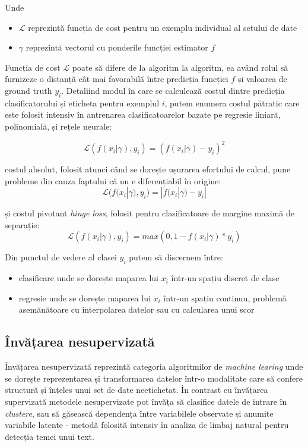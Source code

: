 Unde 
\begin{itemize}
\item $\mathcal{L}$ reprezintă funcția de cost pentru un exemplu individual al setului de date
\item $\gamma$ reprezintă vectorul cu ponderile funcției estimator $f$ 
\end{itemize}

Funcția de cost $\mathcal{L}$ poate să difere de la algoritm la algoritm, ea având rolul să furnizeze o distanță cât mai favorabilă între predicția funcției $f$ și valoarea de ground truth $y_i$. Detaliind modul în care se calculează costul dintre predicția clasificatorului și eticheta pentru exemplul $i$, putem enumera costul pătratic care este folosit intensiv în antrenarea clasificatoarelor bazate pe regresie liniară, polinomială, și rețele neurale:

\begin{equation}
\mathcal{L}(f(x_i | \gamma), y_i) = (f(x_i | \gamma) -  y_i)^2
\label{eq:mse}
\end{equation}

costul absolut, folosit atunci când se dorește ușurarea efortului de calcul, pune probleme din cauza faptului că nu e diferențiabil în origine:
\begin{equation}
\mathcal{L}(f(x_i | \gamma), y_i) = |f(x_i | \gamma) -  y_i|
\label{eq:abserr}
\end{equation}

și costul pivotant \textit{hinge loss}, folosit pentru clasificatoare de margine maximă de separație:
\begin{equation}
\mathcal{L}(f(x_i | \gamma), y_i) = max(0,1 -  f(x_i | \gamma)*y_i)
\label{eq:hinge}
\end{equation}

Din punctul de vedere al clasei $y_i$ putem să discernem între:
\begin{itemize}
\item clasificare unde se dorește maparea lui $x_i$ într-un spațiu discret de clase
\item regresie unde se dorește maparea lui $x_i$ într-un spațiu continuu, problemă asemănătoare cu interpolarea datelor sau cu calcularea unui scor
\end{itemize}

\subsection{Învățarea nesupervizată}
Învățarea nesupervizată reprezintă categoria algoritmilor de \textit{machine learing} unde se dorește reprezentarea și transformarea datelor într-o modalitate care să confere structură și înțeles unui set de date neetichetat. În contrast cu învățarea supervizată metodele nesupervizate pot învăța să clasifice datele de intrare în \textit{clustere}, sau să găsească dependența între variabilele observate și anumite variabile latente - metodă folosită intensiv în analiza de limbaj natural pentru detecția temei unui text.

